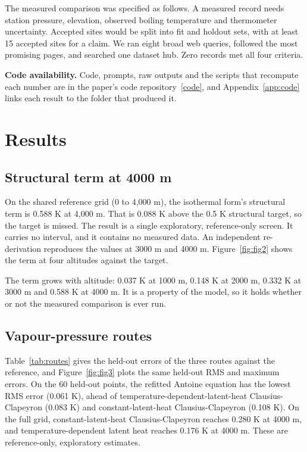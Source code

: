 \documentclass[11pt,letterpaper]{article}
\begin{document}
The measured comparison was specified as follows. A measured record needs station pressure, elevation, observed boiling temperature and thermometer uncertainty. Accepted sites would be split into fit and holdout sets, with at least 15 accepted sites for a claim. We ran eight broad web queries, followed the most promising pages, and searched one dataset hub. Zero records met all four criteria.

\textbf{Code availability.} Code, prompts, raw outputs and the scripts that recompute each number are in the paper's code repository~\href{https://github.com/ai-inventor-papers/ai-invention-afc680-barometric-formula-predicts-waters/tree/main}{[code]}, and Appendix~\ref{app:code} links each result to the folder that produced it.

\section{Results}\label{sec:results}

\subsection{Structural term at 4000 m}\label{sec:headline}

On the shared reference grid (0 to 4,000 m), the isothermal form's structural term is 0.588 K at 4,000 m. That is 0.088 K above the 0.5 K structural target, so the target is missed. The result is a single exploratory, reference-only screen. It carries no interval, and it contains no measured data. An independent re-derivation reproduces the values at 3000 m and 4000 m. Figure~\ref{fig:fig2} shows the term at four altitudes against the target.

The term grows with altitude: 0.037 K at 1000 m, 0.148 K at 2000 m, 0.332 K at 3000 m and 0.588 K at 4000 m. It is a property of the model, so it holds whether or not the measured comparison is ever run.

\subsection{Vapour-pressure routes}\label{sec:routes}

Table~\ref{tab:routes} gives the held-out errors of the three routes against the reference, and Figure~\ref{fig:fig3} plots the same held-out RMS and maximum errors. On the 60 held-out points, the refitted Antoine equation has the lowest RMS error (0.061 K), ahead of temperature-dependent-latent-heat Clausius-Clapeyron (0.083 K) and constant-latent-heat Clausius-Clapeyron (0.108 K). On the full grid, constant-latent-heat Clausius-Clapeyron reaches 0.280 K at 4000 m, and temperature-dependent latent heat reaches 0.176 K at 4000 m. These are reference-only, exploratory estimates.
\end{document}
